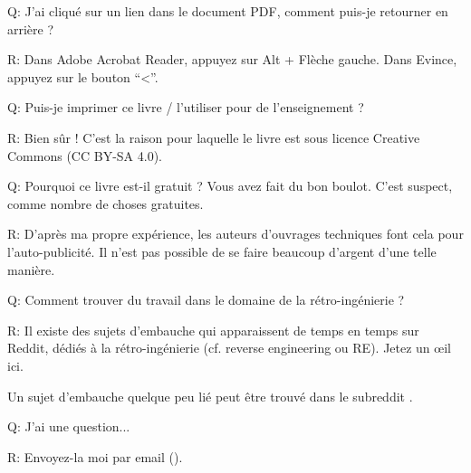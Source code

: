 \par Q: J'ai cliqué sur un lien dans le document PDF, comment puis-je retourner en arrière ?
\par R: Dans Adobe Acrobat Reader, appuyez sur Alt + Flèche gauche. Dans Evince, appuyez sur le bouton ``<''.

\par Q: Puis-je imprimer ce livre / l'utiliser pour de l'enseignement ?
\par R: Bien sûr ! C'est la raison pour laquelle le livre est sous licence Creative Commons (CC BY-SA 4.0).

\par Q: Pourquoi ce livre est-il gratuit ? Vous avez fait du bon boulot. C'est suspect, comme nombre de choses gratuites.
\par R: D'après ma propre expérience, les auteurs d'ouvrages techniques font cela pour l'auto-publicité. Il n'est pas possible de se faire beaucoup d'argent d'une telle manière.

\par Q: Comment trouver du travail dans le domaine de la rétro-ingénierie ?
\par R: Il existe des sujets d'embauche qui apparaissent de temps en temps sur Reddit, dédiés à la rétro-ingénierie (cf. reverse engineering ou RE)\FNURLREDDIT{}.
Jetez un \oe{}il ici.

Un sujet d'embauche quelque peu lié peut être trouvé dans le subreddit .

\par Q: J'ai une question...
\par R: Envoyez-la moi par email (\EMAIL).

